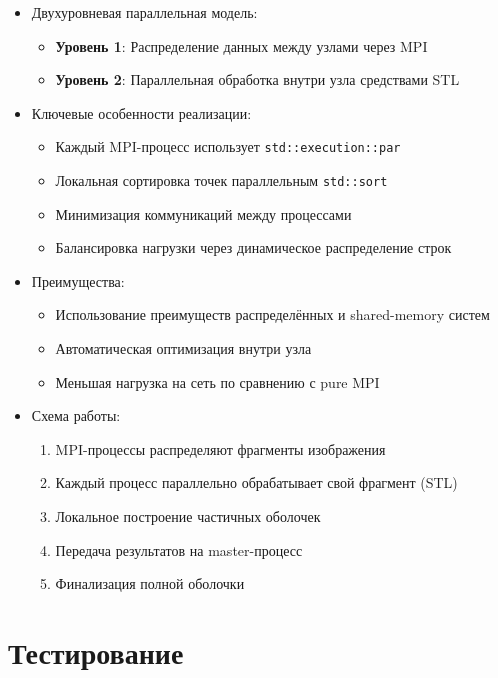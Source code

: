 \documentclass[12pt]{article}
\begin{document}
\begin{itemize}
    \item Двухуровневая параллельная модель:
    \begin{itemize}
        \item \textbf{Уровень 1}: Распределение данных между узлами через MPI
        \item \textbf{Уровень 2}: Параллельная обработка внутри узла средствами STL
    \end{itemize}
    
    \item Ключевые особенности реализации:
    \begin{itemize}
        \item Каждый MPI-процесс использует \texttt{std::execution::par}
        \item Локальная сортировка точек параллельным \texttt{std::sort}
        \item Минимизация коммуникаций между процессами
        \item Балансировка нагрузки через динамическое распределение строк
    \end{itemize}
    
    \item Преимущества:
    \begin{itemize}
        \item Использование преимуществ распределённых и shared-memory систем
        \item Автоматическая оптимизация внутри узла
        \item Меньшая нагрузка на сеть по сравнению с pure MPI
    \end{itemize}
    
    \item Схема работы:
    \begin{enumerate}
        \item MPI-процессы распределяют фрагменты изображения
        \item Каждый процесс параллельно обрабатывает свой фрагмент (STL)
        \item Локальное построение частичных оболочек
        \item Передача результатов на master-процесс
        \item Финализация полной оболочки
    \end{enumerate}
\end{itemize}

\section{Тестирование}
\end{document}
